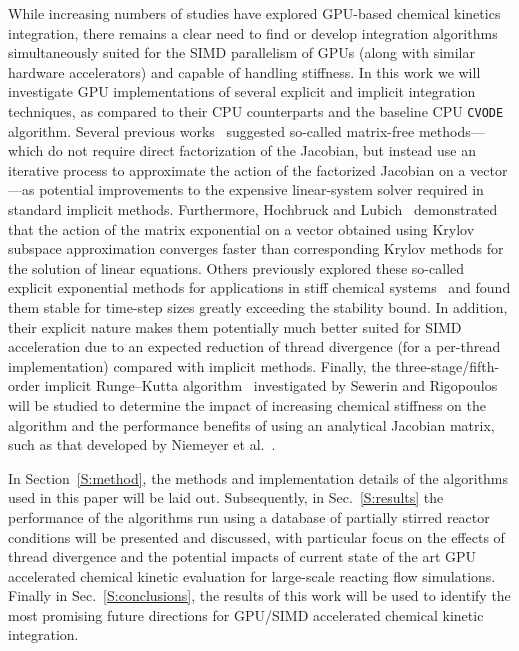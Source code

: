 \documentclass[final,twocolumn]{elsarticle}
\begin{document}
While increasing numbers of studies have explored GPU-based chemical kinetics integration, there remains a clear need to find or develop integration algorithms simultaneously suited for the SIMD parallelism of GPUs (along with similar hardware accelerators) and capable of handling stiffness.
In this work we will investigate GPU implementations of several explicit and implicit integration techniques, as compared to their CPU counterparts and the baseline CPU \texttt{CVODE}~\cite{Hindmarsh:2005hg} algorithm.
Several previous works~\cite{Perini20141180,McNenly2015581} suggested so-called matrix-free methods---which do not require direct factorization of the Jacobian, but instead use an iterative process to approximate the action of the factorized Jacobian on a vector---as potential improvements to the expensive linear-system solver required in standard implicit methods.
Furthermore, Hochbruck and Lubich~\cite{Hochbruck:1997} demonstrated that the action of the matrix exponential on a vector obtained using Krylov subspace approximation converges faster than corresponding Krylov methods for the solution of linear equations.
Others previously explored these so-called explicit exponential methods for applications in stiff chemical systems~\cite{Bisetti:2012jw,falati2011integration} and found them stable for time-step sizes greatly exceeding the stability bound.
In addition, their explicit nature makes them potentially much better suited for SIMD acceleration due to an expected reduction of thread divergence (for a per-thread implementation) compared with implicit methods.
Finally, the three-stage\slash fifth-order implicit Runge--Kutta algorithm~\cite{wanner1991solving} investigated by Sewerin and Rigopoulos~\cite{Sewerin20151375} will be studied to determine the impact of increasing chemical stiffness on the algorithm and the performance benefits of using an analytical Jacobian matrix, such as that developed by Niemeyer et al.~\cite{niemeyer_2016_51139,Niemeyer:2015ws}.

In Section~\ref{S:method}, the methods and implementation details of the algorithms used in this paper will be laid out.
Subsequently, in Sec.~\ref{S:results} the performance of the algorithms run using a database of partially stirred reactor conditions will be presented and discussed, with particular focus on the effects of thread divergence and the potential impacts of current state of the art GPU accelerated chemical kinetic evaluation for large-scale reacting flow simulations.
Finally in Sec.~\ref{S:conclusions}, the results of this work will be used to identify the most promising future directions for GPU\slash SIMD accelerated chemical kinetic integration.
\end{document}

